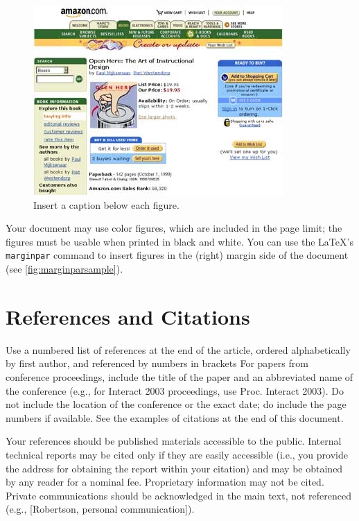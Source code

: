 \documentclass{chi-ext}
\begin{document}
\begin{figure}
  \centering
  \includegraphics[width=\linewidth]{sample.jpg}
  \caption{Insert a caption below each figure.}
  \label{fig:sample}
\end{figure}

Your document may use color figures, which are included in the page limit; the figures must be usable when printed in black and white.
You can use the \LaTeX's \texttt{marginpar} command to insert figures in the (right) margin side of the document (see \autoref{fig:marginparsample}).


\section{References and Citations}
Use a numbered list of references at the end of the article, ordered alphabetically by first author, and referenced by numbers in brackets \cite{Anderson92,Klemmer02,Mather00,Zellweger01}
For papers from conference proceedings, include the title of the paper and an abbreviated name of the conference (e.g., for Interact 2003 proceedings, use Proc. Interact 2003). 
Do not include the location of the conference or the exact date; do include the page numbers if available. 
See the examples of citations at the end of this document. 

Your references should be published materials accessible to the public.  
Internal technical reports may be cited only if they are easily accessible (i.e., you provide the address for obtaining the report within your citation) and may be obtained by any reader for a nominal fee.  
Proprietary information may not be cited. 
Private communications should be acknowledged in the main text, not referenced  (e.g., [Robertson, personal communication]).
\end{document}
